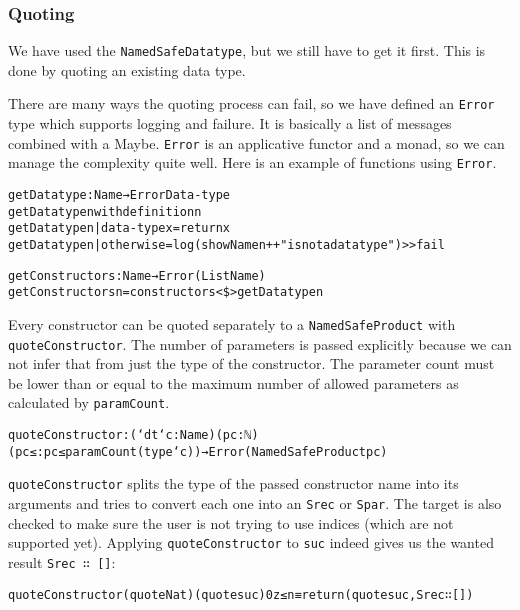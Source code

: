 \subsubsection[Quoting]{Quoting}
\label{sec:prototype-quoting}

We have used the \texttt{NamedSafeDatatype}, but we still have to get
it first.
This is done by quoting an existing data type.

There are many ways the quoting process can fail, so we have defined
an \texttt{Error} type which supports logging
and failure.
It is basically a list of messages combined with a Maybe.
\texttt{Error} is an applicative functor and a monad, so we can manage
the complexity quite well.
Here is an example of functions using \texttt{Error}.

\begin{alltt}
getDatatype : Name → Error Data-type
getDatatype n with definition n
getDatatype n | data-type x = return x
getDatatype n | otherwise = log (showName n ++ " is not a data type") >> fail

getConstructors : Name → Error (List Name)
getConstructors n = constructors <\$> getDatatype n
\end{alltt}

Every constructor can be quoted separately to a
\texttt{NamedSafeProduct} with \texttt{quoteConstructor}.
The number of parameters is passed explicitly because we can not infer
that from just the type of the constructor.
The parameter count must be lower than or equal to the maximum number
of allowed parameters as calculated by \texttt{paramCount}.

\begin{alltt}
quoteConstructor : (`dt `c : Name)(pc : ℕ)
  (pc≤ : pc ≤ paramCount (type `c)) → Error (NamedSafeProduct {pc})
\end{alltt}

\texttt{quoteConstructor} splits the type of the passed constructor
name into its arguments and tries to convert each one into an
\texttt{Srec} or \texttt{Spar}.
The target is also checked to make sure the user is not trying to use
indices (which are not supported yet).
Applying \texttt{quoteConstructor} to \texttt{suc} indeed gives us the
wanted result \texttt{Srec ∷ []}:

\begin{alltt}
quoteConstructor (quote Nat) (quote suc) 0 z≤n ≡ return (quote suc , Srec ∷ [])
\end{alltt}

